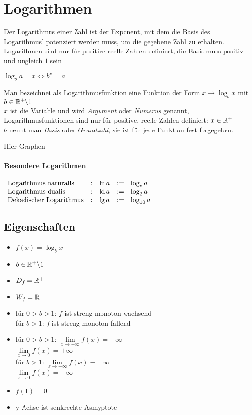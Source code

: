 \chapter{Logarithmen}

\begin{Definition}
Der Logarithmus einer Zahl ist der Exponent, mit dem die Basis des Logarithmus' potenziert werden muss, um die gegebene Zahl zu erhalten. Logarithmen sind nur für positive reelle Zahlen definiert, die Basis muss positiv und ungleich $1$  sein
\begin{center}
$\log_ba=x\Leftrightarrow b^x=a$
\end{center}
\end{Definition}

\begin{Definition}
Man bezeichnet als Logarithmusfunktion eine Funktion der Form $x\rightarrow \log_bx$ mit $b\in \mathbb{R}^+\backslash 1$\\
$x$ ist die Variable und wird \textit{Argument} oder \textit{Numerus} genannt, Logarithmusfunktionen sind nur für positive, reelle Zahlen definiert: $x\in\mathbb{R}^+$\\
$b$ nennt man \textit{Basis} oder \textit{Grundzahl}, sie ist für jede Funktion fest forgegeben.\\
\end{Definition}

Hier Graphen
\subsubsection{Besondere Logarithmen}

$\begin{array}{lcccl}
\mbox{Logarithmus naturalis}&:&\ln a&:=&\log_ea\\
\mbox{Logarithmus dualis}&:&\operatorname{ld} a&:=&\log_2a\\
\mbox{Dekadischer Logarithmus}&:&\lg a&:=&\log_{10}a
\end{array}$
\\
	\section{Eigenschaften}	

\begin{itemize}
\item$f(x)=\log_bx$
\item$b\in\mathbb{R}^+\backslash 1$
\item$D_f=\mathbb{R}^+$
\item$W_f=\mathbb{R}$
\item für $0>b>1$: $f$ ist streng monoton wachsend\\
für $b>1$: $f$ ist streng monoton fallend
\item für $0>b>1$: $\lim\limits_{x\to +\infty}f(x)=-\infty$\\
			$\lim\limits_{x\to 0}f(x)=+\infty$\\
für $b>1$: $\lim\limits_{x\to +\infty}f(x)=+\infty$\\
	        $\lim\limits_{x\to 0}f(x)=-\infty$
\item $f(1)=0$
\item y-Achse ist senkrechte Asmyptote
\end{itemize}
